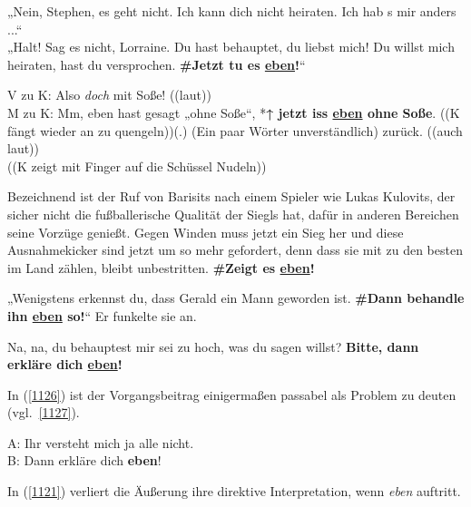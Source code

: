 \begin{exe}
	\ex\label{1122} 

 	 „Nein, Stephen, es geht nicht. Ich kann dich nicht heiraten. Ich hab s mir anders ...“\\
	„Halt! Sag es nicht, Lorraine. Du hast behauptet, du liebst mich! Du willst mich heiraten, hast du versprochen. \textbf{\#Jetzt tu es 					\ul{eben}!}“ 	
\end{exe}	

\begin{exe}
	\ex\label{1123} 

 	V zu K: Also \textit{doch} mit Soße! ((laut))\\
	M zu K: Mm, eben hast gesagt „ohne Soße“, *\textbf{↑ jetzt iss \ul{eben} ohne Soße}. ((K fängt wieder an zu quengeln))(.) 		(Ein paar Wörter unverständlich) zurück. ((auch laut))\\
	((K zeigt mit Finger auf die Schüssel Nudeln))	
\end{exe}

\begin{exe}
	\ex\label{1124} 

 	Bezeichnend ist der Ruf von Barisits nach einem Spieler wie Lukas Kulovits, der sicher nicht die fußballerische Qualität der Siegls hat, dafür in 			anderen Bereichen seine Vorzüge genießt. Gegen Winden muss jetzt ein Sieg her und diese Ausnahmekicker sind jetzt um so mehr gefordert, denn dass sie 		mit zu den besten im Land zählen, bleibt unbestritten. \textbf{\#Zeigt es \ul{eben}!}	
\end{exe}	

\begin{exe}
	\ex\label{1125} 
	„Wenigstens erkennst du, dass Gerald ein Mann geworden ist. \textbf{\#Dann behandle ihn \ul{eben} so!}“ Er funkelte sie an.
\end{exe}	

\begin{exe}
	\ex\label{1126} 
	Na, na, du behauptest mir sei zu hoch, was du sagen willst? \textbf{Bitte, dann erkläre dich \ul{eben}!}
\end{exe}
In (\ref{1126}) ist der Vorgangsbeitrag einigermaßen passabel als Problem zu deuten (vgl.\ \ref{1127}).

\begin{exe}
	\ex\label{1127} 
	A: Ihr versteht mich ja alle nicht.\\
	B: Dann erkläre dich \textbf{eben}!
\end{exe}
In (\ref{1121}) verliert die Äußerung ihre direktive Interpretation, wenn \textit{eben} auftritt. 
	
